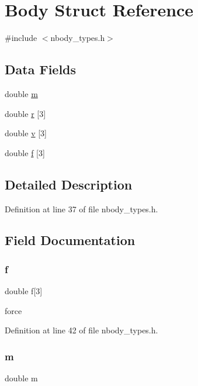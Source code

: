 \hypertarget{struct_body}{}\section{Body Struct Reference}
\label{struct_body}


{\ttfamily \#include $<$nbody\+\_\+types.\+h$>$}

\subsection*{Data Fields}
\begin{DoxyCompactItemize}
\item 
double \hyperlink{struct_body_a5175b356eac1d83a42608b42a25d00b9}{m}
\item 
double \hyperlink{struct_body_a32028928bab6f6e926f89bf7c52c4138}{r} \mbox{[}3\mbox{]}
\item 
double \hyperlink{struct_body_ad8b2664bf7d7db7f9685845624616041}{v} \mbox{[}3\mbox{]}
\item 
double \hyperlink{struct_body_a74c08c3b509575a337bf62d564991340}{f} \mbox{[}3\mbox{]}
\end{DoxyCompactItemize}


\subsection{Detailed Description}


Definition at line 37 of file nbody\+\_\+types.\+h.



\subsection{Field Documentation}
\hypertarget{struct_body_a74c08c3b509575a337bf62d564991340}{}\label{struct_body_a74c08c3b509575a337bf62d564991340} 
\subsubsection{\texorpdfstring{f}{f}}
{\footnotesize\ttfamily double f\mbox{[}3\mbox{]}}

force 

Definition at line 42 of file nbody\+\_\+types.\+h.

\hypertarget{struct_body_a5175b356eac1d83a42608b42a25d00b9}{}\label{struct_body_a5175b356eac1d83a42608b42a25d00b9} 
\subsubsection{\texorpdfstring{m}{m}}
{\footnotesize\ttfamily double m}


